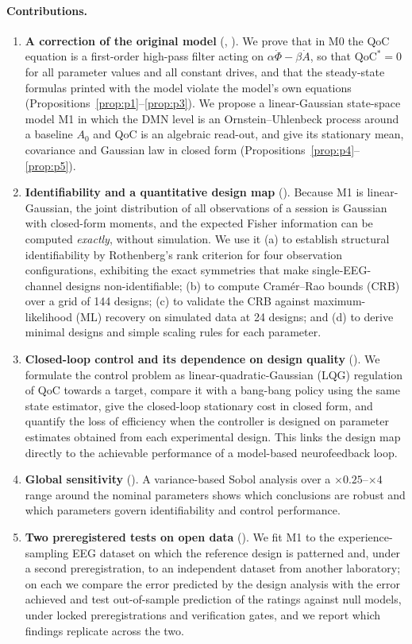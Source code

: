 \documentclass[12pt,a4paper]{article}
\theoremstyle{plain}
\theoremstyle{definition}
\theoremstyle{remark}
\newcommand{\QoC}{\mathrm{QoC}}
\begin{document}
\paragraph{Contributions.}
\begin{enumerate}
  \item \textbf{A correction of the original model} (, ). We prove that in M0 the QoC equation is a first-order high-pass filter acting on $\alpha\dot\Phi-\beta\dot A$, so that $\QoC^*=0$ for all parameter values and all constant drives, and that the steady-state formulas printed with the model violate the model's own equations (Propositions~\ref{prop:p1}--\ref{prop:p3}). We propose a linear-Gaussian state-space model M1 in which the DMN level is an Ornstein--Uhlenbeck process around a baseline $A_0$ and QoC is an algebraic read-out, and give its stationary mean, covariance and Gaussian law in closed form (Propositions~\ref{prop:p4}--\ref{prop:p5}).
  \item \textbf{Identifiability and a quantitative design map} (). Because M1 is linear-Gaussian, the joint distribution of all observations of a session is Gaussian with closed-form moments, and the expected Fisher information can be computed \emph{exactly}, without simulation. We use it (a) to establish structural identifiability by Rothenberg's rank criterion for four observation configurations, exhibiting the exact symmetries that make single-EEG-channel designs non-identifiable; (b) to compute Cram\'er--Rao bounds (CRB) over a grid of 144 designs; (c) to validate the CRB against maximum-likelihood (ML) recovery on simulated data at 24 designs; and (d) to derive minimal designs and simple scaling rules for each parameter.
  \item \textbf{Closed-loop control and its dependence on design quality} (). We formulate the control problem as linear-quadratic-Gaussian (LQG) regulation of QoC towards a target, compare it with a bang-bang policy using the same state estimator, give the closed-loop stationary cost in closed form, and quantify the loss of efficiency when the controller is designed on parameter estimates obtained from each experimental design. This links the design map directly to the achievable performance of a model-based neurofeedback loop.
  \item \textbf{Global sensitivity} (). A variance-based Sobol analysis over a $\times 0.25$--$\times 4$ range around the nominal parameters shows which conclusions are robust and which parameters govern identifiability and control performance.
  \item \textbf{Two preregistered tests on open data} (). We fit M1 to the experience-sampling EEG dataset on which the reference design is patterned and, under a second preregistration, to an independent dataset from another laboratory; on each we compare the error predicted by the design analysis with the error achieved and test out-of-sample prediction of the ratings against null models, under locked preregistrations and verification gates, and we report which findings replicate across the two.
\end{enumerate}
\end{document}
